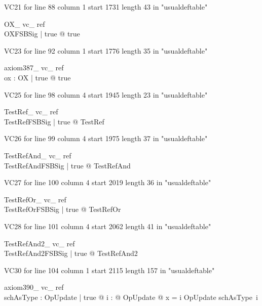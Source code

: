 \documentclass{article}
\begin{document}
VC21 for line 88 column 1 start 1731 length 43 in "usualdeftable"
\begin{theorem}{ OX\_ vc\_ ref}\\
 \exists OXFSBSig | true @ true \\

\end{theorem}

VC23 for line 92 column 1 start 1776 length 35 in "usualdeftable"
\begin{theorem}{ axiom387\_ vc\_ ref}\\
 \exists ox : OX | true @ true \\

\end{theorem}

VC25 for line 98 column 4 start 1945 length 23 in "usualdeftable"
\begin{theorem}{ TestRef\_ vc\_ ref}\\
 \forall TestRefFSBSig | true @ \pre TestRef \\

\end{theorem}

VC26 for line 99 column 4 start 1975 length 37 in "usualdeftable"
\begin{theorem}{ TestRefAnd\_ vc\_ ref}\\
 \forall TestRefAndFSBSig | true @ \pre TestRefAnd \\

\end{theorem}

VC27 for line 100 column 4 start 2019 length 36 in "usualdeftable"
\begin{theorem}{ TestRefOr\_ vc\_ ref}\\
 \forall TestRefOrFSBSig | true @ \pre TestRefOr \\

\end{theorem}

VC28 for line 101 column 4 start 2062 length 41 in "usualdeftable"
\begin{theorem}{ TestRefAnd2\_ vc\_ ref}\\
 \forall TestRefAnd2FSBSig | true @ \pre TestRefAnd2 \\

\end{theorem}

VC30 for line 104 column 1 start 2115 length 157 in "usualdeftable"
\begin{theorem}{ axiom390\_ vc\_ ref}\\
 \exists schAsType : \nat \fun \power OpUpdate | true @ \forall i : \nat @ \exists OpUpdate @ x = i \land \theta OpUpdate \in schAsType~i \\

\end{theorem}
\end{document}
